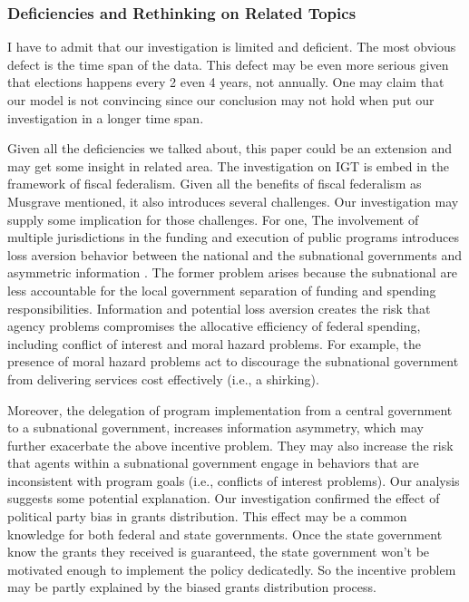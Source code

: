 \subsubsection{Deficiencies and Rethinking on Related Topics}
I have to admit that our investigation is limited and deficient. The most obvious defect is the time span of the data. This defect may be even more serious given that elections happens every 2 even 4 years, not annually. One may claim that our model is not convincing since our conclusion may not hold when put our investigation in a longer time span.

Given all the deficiencies we talked about, this paper could be an extension and may get some insight in related area. The investigation on IGT is embed in the framework of fiscal federalism. Given all the benefits of fiscal federalism as Musgrave \cite{musgrave1971economics} mentioned, it also introduces several challenges. Our investigation may supply some implication for those challenges. For one, The involvement of multiple jurisdictions in the funding and execution of public programs introduces loss aversion behavior between the national and the subnational governments \cite{alesina2019loss,bourdeaux2018loss,rees2014loss} and asymmetric information \cite{brennan1987efficient,huber2006optimal,miller1985dividend}. The former problem arises because the subnational are less accountable for the local government separation of funding and spending responsibilities. Information and potential loss aversion creates the risk that agency problems compromises the allocative efficiency of federal spending, including conflict of interest and moral hazard problems. For example, the presence of moral hazard problems act to discourage the subnational government from delivering services cost effectively \cite{williams2021moral}(i.e., a shirking).

Moreover, the delegation of program implementation from a central government to a subnational government, increases information asymmetry, which may further exacerbate the above incentive problem. They may also increase the risk that agents within a subnational government engage in behaviors that are inconsistent with program goals (i.e., conflicts of interest problems). Our analysis suggests some potential explanation. Our investigation confirmed the effect of political party bias in grants distribution. This effect may be a common knowledge for both federal and state governments. Once the state government know the grants they received is guaranteed, the state government won’t be motivated enough to implement the policy dedicatedly. So the incentive problem may be partly explained by the biased grants distribution process.

